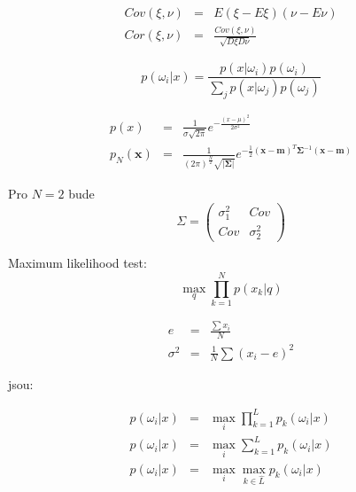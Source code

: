 \begin{eqnarray}
Cov(\xi,\nu)&=&E(\xi-E\xi)(\nu-E\nu)\\
Cor(\xi,\nu)&=&\frac{Cov(\xi,\nu)}{\sqrt{D\xi D\nu}}
\end{eqnarray}


\begin{equation}
p(\omega_i|x)=\frac{p(x|\omega_i)p(\omega_i)}{\sum\limits_j p(x|\omega_j)p(\omega_j)}
\end{equation}

\begin{description}
\end{description}



\def\x{\mathbf{x}}
\def\m{\mathbf{m}}
\def\bSigma{\mathbf{\Sigma}}

\begin{eqnarray}
p(x)&=&\frac{1}{\sigma \sqrt{2\pi}}e^{-\frac{(x-\mu)^2}{2\sigma^2}}\\
p_N(\x)&=&\frac{1}{(2\pi)^\frac{N}{2}\sqrt{|\bSigma|}}e^{-\frac{1}{2}(\x-\m)^T\bSigma^{-1}(\x-\m)}
\end{eqnarray}


Pro $N=2$ bude
$$
\Sigma=\left(\begin{array}{cc}\sigma_1^2 & Cov\\ Cov & \sigma_2^2\end{array}\right)
$$






\begin{itemize}
\end{itemize}


Maximum likelihood test:
\begin{equation}
\max\limits_q\prod\limits_{k=1}^N p(x_k|q)
\end{equation}


\begin{eqnarray}
e&=&\frac{\sum x_i}{N}\\
\sigma^2&=&\frac{1}{N}\sum(x_i-e)^2
\end{eqnarray}



\begin{itemize}
\end{itemize}

jsou:
\begin{itemize}
\end{itemize}




\begin{eqnarray}
p(\omega_i|x)&=&\max\limits_i\prod\limits_{k=1}^L p_k(\omega_i|x)\\
p(\omega_i|x)&=&\max\limits_i \sum\limits_{k=1}^L p_k(\omega_i|x)\\
p(\omega_i|x)&=&\max\limits_i \max\limits_{k\in\hat{L}} p_k(\omega_i|x)
\end{eqnarray}





